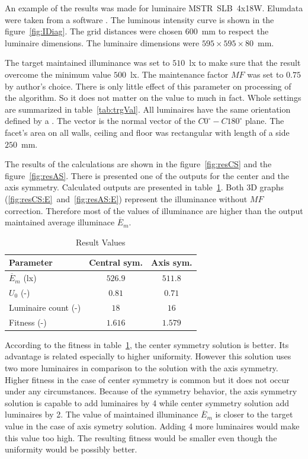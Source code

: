 An example of the results was made for luminaire MSTR~SLB~4x18W. Elumdata were taken from a software . The luminous intensity curve is shown in the figure~\ref{fig:IDiag}. The grid distances were chosen $600$~mm to respect the luminaire dimensions. The luminaire dimensions were $595\times 595\times 80$~mm.

The target maintained illuminance was set to $510$~lx to make sure that the result overcome the minimum value $500$~lx. The maintenance factor $MF$ was set  to $0.75$ by author's choice. There is only little effect of this parameter on processing of the algorithm. So it does not matter on the value to much in fact. Whole settings are summarized in table~\ref{tab:trgVal}. All luminaires have the same orientation defined by a . The vector is the normal vector of the $C0^\circ-C180^\circ$ plane. The facet's area on all walls, ceiling and floor was rectangular with length of a side $250$~mm.

The results of the calculations are shown in the figure~\ref{fig:resCS} and the figure~\ref{fig:resAS}. There is presented one of the outputs for the center and the axis symmetry.  Calculated outputs are presented in table~\ref{tab:resVal}. Both 3D graphs (\ref{fig:resCS:E}~and~\ref{fig:resAS:E}) represent the illuminance without $MF$ correction. Therefore most of the values of illuminance are higher than the output maintained average illuminace $\overline{E}_{m}$.

\begin{table}[htb]
	\renewcommand{\arraystretch}{1.3}
	\caption{Result Values}
 	\label{tab:resVal}
	\centering
  \begin{tabular}{| l | c | c |}
	  \hline
	  \textbf{Parameter} & \textbf{Central sym.} & \textbf{Axis sym.}\\
    \hline
    $\overline{E}_{m}$ (lx) & $526.9$ & $511.8$ \\
    \hline
    $U_{0}$ (-) & $0.81$ & $0.71$ \\
    \hline
		Luminaire count (-) & $18$ & $16$ \\
    \hline
		Fitness (-) & $1.616$ & $1.579$ \\
    \hline
  \end{tabular}
\end{table}

According to the fitness in table~\ref{tab:resVal}, the center symmetry solution is better. Its advantage is related especially to higher uniformity. However this solution uses two more luminaires in comparison to the solution with the axis symmetry. Higher fitness in the case of center symmetry is common but it does not occur under any circumstances. Because of the symmetry behavior, the axis symmetry solution is capable to add luminaires by 4 while center symmetry solution add luminaires by 2. The value of maintained illuminance $\overline{E}_{m}$ is closer to the target value in the case of axis symetry solution. Adding 4 more luminaires would make this value too high. The resulting fitness would be smaller even though the uniformity would be possibly better.

